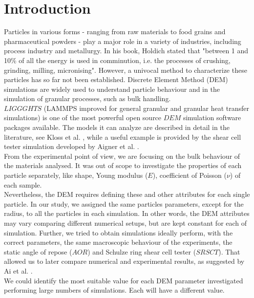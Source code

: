 \section{Introduction}
\label{sec:introduction}

Particles in various forms - ranging from raw materials to food grains and pharmaceutical powders - 
play a major role in a variety of industries, including process industry and metallurgy. 
In his book, Holdich \cite{RefWorks:117} stated that "between 1 and 10\% of all the energy 
is used in comminution, i.e. the processes of crushing, grinding, milling, micronising". 
However, a univocal method to characterize these particles has so far not been established. 
Discrete Element Method (DEM) simulations are widely used to understand particle behaviour 
and in the simulation of granular processes, such as bulk handling.\\
$LIGGGHTS$ (LAMMPS improved for general granular and granular heat transfer simulations) 
is one of the most powerful open source $DEM$ simulation software packages available. 
The models it can analyze are described in detail in the literature, see Kloss
et al. \cite{RefWorks:136}, while a useful example is provided by the shear cell tester 
simulation developed by Aigner et al. \cite{RefWorks:139}.\\
From the experimental point of view, we are focusing on the bulk behaviour of the materials analysed. 
It was out of scope to investigate the properties of each particle separately, like shape, 
Young modulus ($E$), coefficient of Poisson ($\nu$) of each sample.\\
Nevertheless, the DEM requires defining these and other attributes for each single particle. 
In our study, we assigned the same particles parameters, except for the radius, to all the 
particles in each simulation. 
In other words, the DEM attributes may vary comparing different 
numerical setups, but are kept constant for each of simulation. 
Further, we tried to obtain simulations ideally perform, with the correct parameters, 
the same macroscopic behaviour of the experiments, the static angle of repose
($AOR$) and Schulze ring shear cell tester ($SRSCT$). That allowed us to later
compare numerical and experimental results, as suggested by Ai et al.
\cite{RefWorks:131}.\\
We could identify the most suitable value for each DEM parameter 
investigated performing large numbers of simulations. Each will have a different value. 
